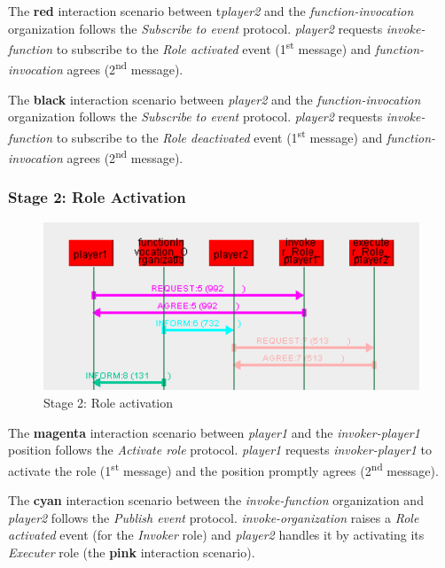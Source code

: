 The \textbf{red} interaction scenario between t\textit{player2} and the \textit{function-invocation} organization follows the \textit{Subscribe to event} protocol.
\textit{player2} requests \textit{invoke-function} to subscribe to the \textit{Role activated} event (1\textsuperscript{st} message) and \textit{function-invocation} agrees (2\textsuperscript{nd} message).

The \textbf{black} interaction scenario between \textit{player2} and the \textit{function-invocation} organization follows the \textit{Subscribe to event} protocol.
\textit{player2} requests \textit{invoke-function} to subscribe to the \textit{Role deactivated} event (1\textsuperscript{st} message) and \textit{function-invocation} agrees (2\textsuperscript{nd} message).

\subsubsection*{Stage 2: Role Activation}

\begin{figure}[H]
	\centering
	\includegraphics[width=\textwidth]{images/examples/example1-stage2.png}
	\caption{Stage 2: Role activation}
	\label{figure:example1-stage2}
\end{figure}

The \textbf{magenta} interaction scenario between \textit{player1} and the \textit{invoker-player1} position follows the \textit{Activate role} protocol.
\textit{player1} requests \textit{invoker-player1} to activate the role (1\textsuperscript{st} message) and the position promptly agrees (2\textsuperscript{nd} message).

The \textbf{cyan} interaction scenario between the \textit{invoke-function} organization and \textit{player2} follows the \textit{Publish event} protocol.
\textit{invoke-organization} raises a \textit{Role activated} event (for the \textit{Invoker} role) and \textit{player2} handles it by activating its \textit{Executer} role (the \textbf{pink} interaction scenario).

